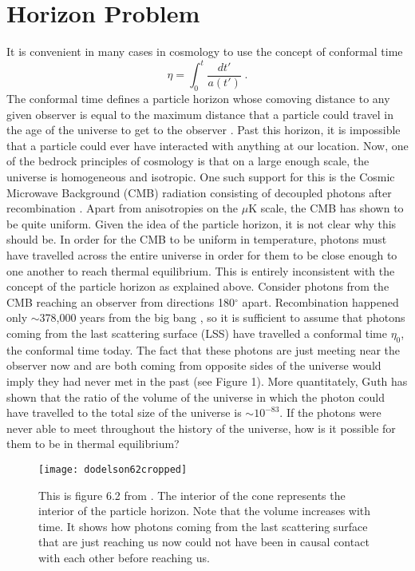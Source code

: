 \documentclass[aps,reprint,prl]{revtex4-1}
\begin{document}
\section*{Horizon Problem}
It is convenient in many cases in cosmology to use the concept of conformal time
\begin{equation}
\eta=\int_0^t\frac{dt'}{a(t')}\;.
\end{equation}
The conformal time defines a particle horizon whose comoving distance to any given observer is equal to the maximum distance that a particle could travel in the age of the universe to get to the observer \cite{wiki:particlehorizon}.  Past this horizon, it is impossible that a particle could ever have interacted with anything at our location.  Now, one of the bedrock principles of cosmology is that on a large enough scale, the universe is homogeneous and isotropic.  One such support for this is the Cosmic Microwave Background (CMB) radiation consisting of decoupled photons after recombination \cite{wiki:recombination}.  Apart from anisotropies on the $\mu$K scale, the CMB has shown to be quite uniform.  Given the idea of the particle horizon, it is not clear why this should be.  In order for the CMB to be uniform in temperature, photons must have travelled across the entire universe in order for them to be close enough to one another to reach thermal equilibrium.  This is entirely inconsistent with the concept of the particle horizon as explained above.  Consider photons from the CMB reaching an observer from directions 180$^\circ$ apart.  Recombination happened only  $\sim$378,000 years from the big bang \cite{wiki:recombination}, so it is sufficient to assume that photons coming from the last scattering surface (LSS) have travelled a conformal time $\eta_0$, the conformal time today.  The fact that these photons are just meeting near the observer now and are both coming from opposite sides of the universe would imply they had never met in the past (see Figure 1).  More quantitately, Guth \cite{guth1981} has shown that the ratio of the volume of the universe in which the photon could have travelled to the total size of the universe is $\sim10^{-83}$.  If the photons were never able to meet throughout the history of the universe, how is it possible for them to be in thermal equilibrium?
\begin{figure}[h]
\texttt{[image: dodelson62cropped]}
\caption{This is figure 6.2 from \cite{Dodelson}.  The interior of the cone represents the interior of the particle horizon.  Note that the volume increases with time.  It shows how photons coming from the last scattering surface that are just reaching us now could not have been in causal contact with each other before reaching us.}
\end{figure}
\end{document}
